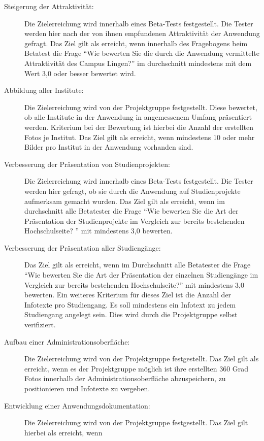 \begin{description}
	\item[Steigerung der Attraktivität:] Die Zielerreichung wird innerhalb eines
	Beta-Tests festgestellt. Die Tester werden hier nach der von ihnen empfundenen
	Attraktivität der Anwendung gefragt. Das Ziel gilt als erreicht, wenn innerhalb
	des Fragebogens beim Betatest die Frage "`Wie bewerten Sie die durch die
	Anwendung vermittelte Attraktivität des Campus Lingen?"' im durchschnitt
	mindestens mit dem Wert 3,0 oder besser bewertet wird.
	\item[Abbildung aller Institute:] Die Zielerreichung wird von der Projektgruppe
	festgestellt. Diese bewertet, ob alle Institute in der Anwendung in
	angemessenem Umfang präsentiert werden. Kriterium bei der Bewertung ist hierbei
	die Anzahl der erstellten Fotos je Institut. Das Ziel gilt als erreicht, wenn
	mindestens 10 oder mehr Bilder pro Institut in der Anwendung vorhanden sind.
	\item[Verbesserung der Präsentation von Studienprojekten:] Die Zielerreichung
	wird innerhalb eines Beta-Tests festgestellt. Die Tester werden hier gefragt,
	ob sie durch die Anwendung auf Studienprojekte aufmerksam gemacht wurden. Das
	Ziel gilt als erreicht, wenn im durchschnitt alle Betatester die Frage "`Wie
	bewerten Sie die Art der Präsentation der Studienprojekte im Vergleich zur
	bereits bestehenden Hochschulseite? "' mit mindestens 3,0 bewerten.
	\item[Verbesserung der Präsentation aller Studiengänge:] Das Ziel
	gilt als erreicht, wenn im Durchschnitt alle Betatester die Frage "`Wie
	bewerten Sie die Art der Präsentation der einzelnen Studiengänge im Vergleich
	zur bereits bestehenden Hochschulseite?"' mit mindestens 3,0 bewerten. Ein
	weiteres Kriterium für dieses Ziel ist die Anzahl der Infotexte pro
	Studiengang. Es soll mindestens ein Infotext zu jedem Studiengang angelegt
	sein.
	Dies wird durch die Projektgruppe selbst verifiziert.
	\item[Aufbau einer Administrationsoberfläche:] Die Zielerreichung wird von der
	Projektgruppe festgestellt. Das Ziel gilt als erreicht, wenn es der
	Projektgruppe möglich ist ihre erstellten 360 Grad Fotos innerhalb der
	Administrationsoberfläche abzuspeichern, zu positionieren und Infotexte zu
	vergeben.%
	\item[Entwicklung einer Anwendungsdokumentation:] Die Zielerreichung wird
	von der Projektgruppe festgestellt. Das Ziel gilt hierbei als erreicht, wenn

\end{description}
